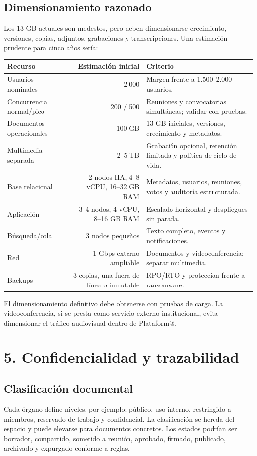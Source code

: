 \documentclass[11pt,a4paper]{article}
\begin{document}
\subsection{Dimensionamiento razonado}

Los 13 GB actuales son modestos, pero deben dimensionarse crecimiento, versiones, copias, adjuntos, grabaciones y transcripciones. Una estimación prudente para cinco años sería:
\begin{center}
\begin{tabularx}{0.95\textwidth}{l r Y}\toprule
\textbf{Recurso} & \textbf{Estimación inicial} & \textbf{Criterio}\\\midrule
Usuarios nominales & 2.000 & Margen frente a 1.500--2.000 usuarios.\\
Concurrencia normal/pico & 200 / 500 & Reuniones y convocatorias simultáneas; validar con pruebas.\\
Documentos operacionales & 100 GB & 13 GB iniciales, versiones, crecimiento y metadatos.\\
Multimedia separada & 2--5 TB & Grabación opcional, retención limitada y política de ciclo de vida.\\
Base relacional & 2 nodos HA, 4--8 vCPU, 16--32 GB RAM & Metadatos, usuarios, reuniones, votos y auditoría estructurada.\\
Aplicación & 3--4 nodos, 4 vCPU, 8--16 GB RAM & Escalado horizontal y despliegues sin parada.\\
Búsqueda/cola & 3 nodos pequeños & Texto completo, eventos y notificaciones.\\
Red & 1 Gbps externo ampliable & Documentos y videoconferencia; separar multimedia.\\
Backups & 3 copias, una fuera de línea o inmutable & RPO/RTO y protección frente a ransomware.\\\bottomrule
\end{tabularx}\end{center}

El dimensionamiento definitivo debe obtenerse con pruebas de carga. La videoconferencia, si se presta como servicio externo institucional, evita dimensionar el tráfico audiovisual dentro de Plataform@.

\section{5. Confidencialidad y trazabilidad}

\subsection{Clasificación documental}
Cada órgano define niveles, por ejemplo: público, uso interno, restringido a miembros, reservado de trabajo y confidencial. La clasificación se hereda del espacio y puede elevarse para documentos concretos. Los estados podrían ser borrador, compartido, sometido a reunión, aprobado, firmado, publicado, archivado y expurgado conforme a reglas.
\end{document}
